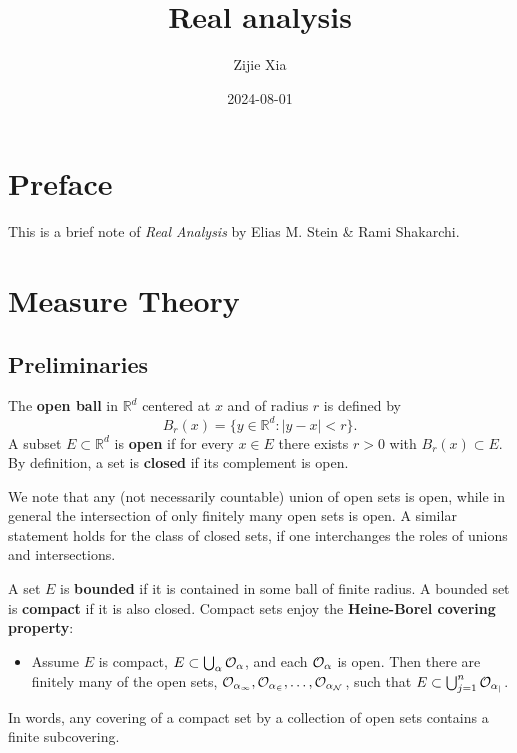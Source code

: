 \documentclass[
]{book}
\title{Real analysis}
\author{Zijie Xia}
\date{2024-08-01}
\providecommand{\tightlist}{%
  \setlength{\itemsep}{0pt}\setlength{\parskip}{0pt}}
\theoremstyle{definition}
\theoremstyle{definition}
\theoremstyle{definition}
\theoremstyle{definition}
\theoremstyle{remark}
\begin{document}
\maketitle

{
\setcounter{tocdepth}{1}
\tableofcontents
}
\chapter*{Preface}\label{preface}

This is a brief note of \emph{Real Analysis} by Elias M. Stein \& Rami Shakarchi.

\chapter{Measure Theory}\label{ch1}

\section{Preliminaries}\label{preliminaries}

The \textbf{open ball} in \(\mathbb{R}^d\) centered at \(x\) and of radius \(r\) is defined by
\[
B_r(x)=\{y\in \mathbb{R}^d :|y−x|<r\}.
\]
A subset \(E\subset\mathbb{R}^d\) is \textbf{open} if for every \(x\in E\) there exists \(r>0\) with \(B_r(x)\subset E\). By definition, a set is \textbf{closed} if its complement is open.

We note that any (not necessarily countable) union of open sets is open, while in general the intersection of only finitely many open sets is open. A similar statement holds for the class of closed sets, if one interchanges the roles of unions and intersections.

A set \(E\) is \textbf{bounded} if it is contained in some ball of finite radius. A bounded set is \textbf{compact} if it is also closed. Compact sets enjoy the \textbf{Heine-Borel covering property}:

\begin{itemize}
\tightlist
\item
  Assume \(E\) is compact, \(E\subset \bigcup_{\alpha}\cal{O}_{\alpha}\), and each \(\cal{O}_{\alpha}\) is open. Then there are finitely many of the open sets, \(\cal{O}_{\alpha_1},{O}_{\alpha_2},\dots,{O}_{\alpha_N}\), such that \(E\subset \bigcup_{j=1}^n\cal{O}_{\alpha_j}\).
\end{itemize}

In words, any covering of a compact set by a collection of open sets contains a finite subcovering.
\end{document}
